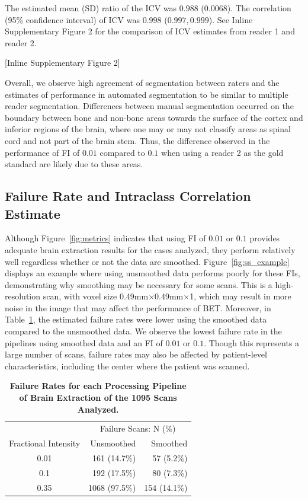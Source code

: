 The estimated mean (SD) ratio of the ICV was $0.988$ ($0.0068$).  The correlation (95\% confidence interval) of ICV was $0.998$ ($0.997, 0.999$).  See Inline Supplementary Figure 2 for the comparison of ICV estimates from reader 1 and reader 2.

[Inline Supplementary Figure 2]


Overall, we observe high agreement of segmentation between raters and the estimates of performance in automated segmentation to be similar to multiple reader segmentation.  Differences between manual segmentation occurred on the boundary between bone and non-bone areas towards the surface of the cortex and inferior regions of the brain, where one may or may not classify areas as spinal cord and not part of the brain stem.  Thus, the difference observed in the performance of FI of $0.01$ compared to $0.1$ when using a reader 2 as the gold standard are likely due to these areas.  


\subsection{Failure Rate and Intraclass Correlation Estimate}
Although Figure~\ref{fig:metrics} indicates that using FI of $0.01$ or $0.1$ provides adequate brain extraction results for the cases analyzed, they perform relatively well regardless whether or not the data are smoothed.  Figure~\ref{fig:ss_example} displays an example where using unsmoothed data performs poorly for these FIs, demonstrating why smoothing may be necessary for some scans.  This is a high-resolution scan, with voxel size 0.49mm$\times$0.49mm$\times$1, which may result in more noise in the image that may affect the performance of BET.  Moreover, in Table~\ref{tab:fail}, the estimated failure rates were lower using the smoothed data compared to the unsmoothed data.  We observe the lowest failure rate in the pipelines using smoothed data and an FI of $0.01$ or $0.1$.  Though this represents a large number of scans, failure rates may also be affected by patient-level characteristics, including the center where the patient was scanned.  

\begin{table}[ht]
\centering
\begin{tabular}{cr|r}
  \hline & \multicolumn{2}{c}{Failure Scans: N (\%)} \\Fractional Intensity & Unsmoothed & Smoothed \\ 
  \hline
0.01 & 161 (14.7\%) & 57 (5.2\%) \\ 
  0.1 & 192 (17.5\%) & 80 (7.3\%) \\ 
  0.35 & 1068 (97.5\%) & 154 (14.1\%) \\ 
   \hline
\end{tabular}
\caption{{\bf Failure Rates for each Processing Pipeline of Brain Extraction of the 1095 Scans Analyzed.}} 
\label{tab:fail}
\end{table}


